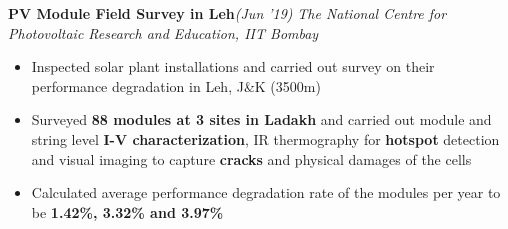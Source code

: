\documentclass[10 pt]{article}%
\begin{document}
{{{\flushleft \bf {\large{PV Module Field Survey in Leh}}}\hfill {{{\em{(Jun '19)}}}}
\vspace{-0.8em}
{\flushleft \em{The National Centre for Photovoltaic Research and Education, IIT Bombay}}
\vspace{-5pt}
\begin{itemize}[leftmargin=*]
\setlength\itemsep{1pt}
\setlength\parskip{1pt}
\item Inspected solar plant installations and carried out survey on their performance degradation in Leh, J\&K (3500m)
\item Surveyed \textbf{88 modules at 3 sites in Ladakh} and carried out module and string level \textbf{I-V characterization}, IR thermography for \textbf{hotspot} detection and visual imaging to capture \textbf{cracks} and physical damages of the cells
\item Calculated average performance degradation rate of the modules per year to be \textbf{1.42\%, 3.32\% and 3.97\%} %
\end{itemize}

}}
\end{document}
